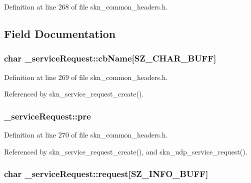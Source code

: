 Definition at line 268 of file skn\+\_\+common\+\_\+headers.\+h.



\subsection{Field Documentation}
\hypertarget{struct__service_request_aab7831722782ba05f0c94087598a941e}{}
\subsubsection[{cb\+Name}]{\setlength{\rightskip}{0pt plus 5cm}char \+\_\+service\+Request\+::cb\+Name\mbox{[}{\bf S\+Z\+\_\+\+C\+H\+A\+R\+\_\+\+B\+U\+F\+F}\mbox{]}}\label{struct__service_request_aab7831722782ba05f0c94087598a941e}


Definition at line 269 of file skn\+\_\+common\+\_\+headers.\+h.



Referenced by skn\+\_\+service\+\_\+request\+\_\+create().

\hypertarget{struct__service_request_acf8d45e7f9cb65b555217aae74cd72c5}{}
\subsubsection[{pre}]{ \+\_\+service\+Request\+::pre}\label{struct__service_request_acf8d45e7f9cb65b555217aae74cd72c5}


Definition at line 270 of file skn\+\_\+common\+\_\+headers.\+h.



Referenced by skn\+\_\+service\+\_\+request\+\_\+create(), and skn\+\_\+udp\+\_\+service\+\_\+request().

\hypertarget{struct__service_request_ad347b2a07388ec9d9d33756f1a1ef235}{}
\subsubsection[{request}]{\setlength{\rightskip}{0pt plus 5cm}char \+\_\+service\+Request\+::request\mbox{[}{\bf S\+Z\+\_\+\+I\+N\+F\+O\+\_\+\+B\+U\+F\+F}\mbox{]}}\label{struct__service_request_ad347b2a07388ec9d9d33756f1a1ef235}


